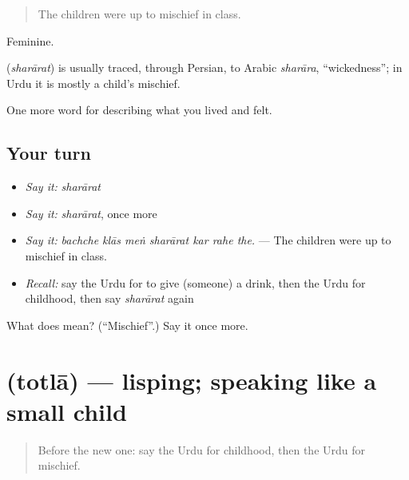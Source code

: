 \begin{quote}
The children were up to mischief in class.
\end{quote}

Feminine.

\begin{cousinweb}
\textbf{} (\emph{sharārat}) is usually traced, through Persian, to Arabic \emph{sharāra}, \textquotedblleft{}wickedness\textquotedblright{}; in Urdu it is mostly a child's mischief.
\end{cousinweb}

\begin{grammarlens}[title={What you've built}]
One more word for describing what you lived and felt.
\end{grammarlens}

\subsection*{Your turn}
\begin{itemize}
\raggedright
  \item \emph{Say it:} \emph{sharārat}
  \item \emph{Say it:} \emph{sharārat}, once more
  \item \emph{Say it:} \emph{bachche klās meṅ sharārat kar rahe the.} — The children were up to mischief in class.
  \item \emph{Recall:} say the Urdu for to give (someone) a drink, then the Urdu for childhood, then say \emph{sharārat} again
\end{itemize}

\begin{tcolorbox}[breakable,colback=teal!4,colframe=teal!35!black,title={Before you move on}]
What does  mean? (\textquotedblleft{}Mischief\textquotedblright{}.) Say it once more.
\end{tcolorbox}
\section[\texorpdfstring{\ur{توتلا} (totlā)}{توتلا (totlā)}]{ (totlā) — lisping; speaking like a small child}

\label{lesson:UR-C485-totla}



\begin{quote}
Before the new one: say the Urdu for childhood, then the Urdu for mischief.
\end{quote}

